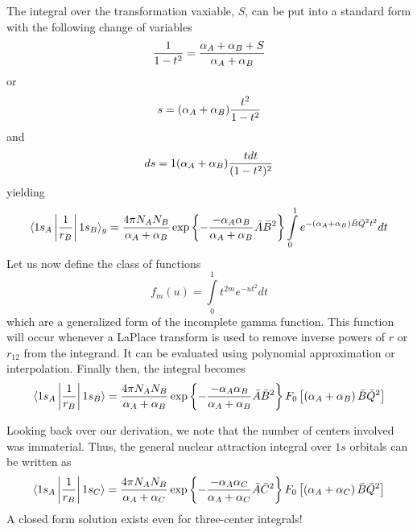 The integral over the transformation vaxiable, $S$, can be put into a standard
form with the following change of variables
\begin{equation}
{1 \over 1 - t^2} = {\alpha_A + \alpha_B + S \over \alpha_A + \alpha_B}
\end{equation}
or
\begin{equation}
s = ( \alpha_A + \alpha_B ) {t^2 \over 1 - t^2}
\end{equation}
and
\begin{equation}
ds = 1 ( \alpha_A + \alpha_B ) {tdt \over (1-t^2)^2}
\end{equation}
yielding
\begin{equation}
\langle 1s_A \left| {1 \over r_B} \right| 1s_B \rangle_g = 
{4 \pi N_AN_B \over \alpha_A + \alpha_B} \exp \left\{ - {-\alpha_A 
\alpha_B \over \alpha_A + \alpha_B} {\bar{A}} {\bar{B}}^2 \right\}
\int\limits^{1}_{0} e^{-(\alpha_A + \alpha_B) {\bar{B}}{\bar{Q}}^2t^2} dt
\end{equation}
Let us now define the class of functions
\begin{equation}
f_m (u) = \int\limits^{1}_{0} t^{2m} e^{-ut^2} dt
\end{equation}
which are a generalized form of the incomplete gamma function. This 
function will occur whenever a LaPlace transform is used to remove inverse 
powers of $r$ or $r_{12}$ from the integrand.  It can be evaluated using 
polynomial approximation or interpolation. Finally then, the integral becomes
\begin{equation}
\langle 1s_A \left| {1 \over r_B} \right| 1s_B \rangle = 
{4 \pi N_AN_B \over \alpha_A + \alpha_B} \exp 
\left\{ - {-\alpha_A \alpha_B \over \alpha_A + \alpha_B} 
{\bar{A}} {\bar{B}}^2 \right\} F_0 \left[ \left( \alpha_A + \alpha_B 
\right) {\bar{B}} {\bar{Q}}^2 \right]
\end{equation}

Looking back over our derivation, we note that the number of centers
involved was immaterial. Thus, the general nuclear attraction integral over
$1s$ orbitals can be written as
\begin{equation}
\langle 1s_A \left| {1 \over r_B} \right| 1s_C \rangle = 
{4 \pi N_AN_B \over \alpha_A + \alpha_C} \exp \left\{ - {-\alpha_A 
\alpha_C \over \alpha_A + \alpha_C} {\bar{A}} {\bar{C}}^2 \right\} 
F_0 \left[ \left( \alpha_A + \alpha_C \right) {\bar{B}} {\bar{Q}}^2 
\right]
\end{equation}
A closed form solution exists even for three-center integrals!

